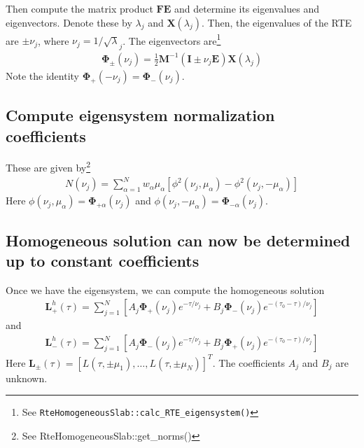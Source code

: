 \documentclass[11pt]{article}
\newcommand{\mvec}[1]{\mathbf{#1}}
\newcommand{\gvec}[1]{\boldsymbol{#1}}
\begin{document}
Then compute the matrix product $\mvec{F}\mvec{E}$ and determine its
eigenvalues and eigenvectors. Denote these by $\lambda_j$ and
$\mvec{X}(\lambda_j)$.  Then, the eigenvalues of the RTE are $\pm
\nu_j$, where $\nu_j = 1/\sqrt\lambda_j$. The eigenvectors
are\footnote{See {\tt RteHomogeneousSlab::calc\_RTE\_eigensystem()}}
\begin{align}
  \gvec{\Phi}_\pm (\nu_j)
  = \frac{1}{2}\mvec{M}^{-1}
  (\mvec{I} \pm \nu_j\mvec{E})\mvec{X}(\lambda_j)
\end{align}
Note the identity $\gvec{\Phi}_+(-\nu_j) =
\gvec{\Phi}_-(\nu_j)$.




\subsection{Compute eigensystem normalization coefficients}
These are given by\footnote{See RteHomogeneousSlab::get\_norms()}
\begin{align}
  N(\nu_j) = \sum_{\alpha=1}^N
  w_\alpha \mu_\alpha
  \left[
    \phi^2(\nu_j,\mu_\alpha) - \phi^2(\nu_j,-\mu_\alpha)
  \right]
\end{align}
Here $\phi(\nu_j,\mu_\alpha) = \gvec{\Phi}_{+\alpha}(\nu_j)$ and
$\phi(\nu_j,-\mu_\alpha) = \gvec{\Phi}_{-\alpha}(\nu_j)$.





\subsection{Homogeneous solution can now be determined up to constant
  coefficients}
Once we have the eigensystem, we can compute the homogeneous solution
\begin{align}
  \mvec{L}^h_+(\tau) = \sum_{j=1}^N
  \left[
    A_j \gvec{\Phi}_+(\nu_j) e^{-\tau/\nu_j} +
    B_j \gvec{\Phi}_-(\nu_j) e^{-(\tau_0-\tau)/\nu_j}
  \right]
\end{align}
and
\begin{align}
  \mvec{L}^h_-(\tau) = \sum_{j=1}^N
  \left[
    A_j \gvec{\Phi}_-(\nu_j) e^{-\tau/\nu_j} +
    B_j \gvec{\Phi}_+(\nu_j) e^{-(\tau_0-\tau)/\nu_j}
  \right]
\end{align}
Here $\mvec{L}_\pm(\tau) = [L(\tau,\pm\mu_1),\ldots,
L(\tau,\pm\mu_N)]^T$. The coefficients $A_j$ and $B_j$ are unknown.
\end{document}
